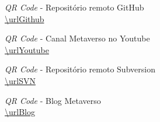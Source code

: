     \begin{figure}[h]
        \centering
        \captionsetup{justification=centering}
        \qrcode{\urlGithub}
        \caption{\textit{QR Code} - Repositório remoto GitHub \\ \url{\urlGithub}}
    \end{figure}
    
    \begin{figure}[h]
        \centering
        \captionsetup{justification=centering}
        \qrcode{\urlYoutube}
        \caption{\textit{QR Code} - Canal Metaverso no Youtube \\ \url{\urlYoutube}}
    \end{figure}
    
    \begin{figure}[h]
        \centering
        \captionsetup{justification=centering}
        \qrcode{\urlSVN}
        \caption{\textit{QR Code} - Repositório remoto Subversion\\
        \url{\urlSVN}}
    \end{figure}
    
    \begin{figure}[h]
        \centering
        \captionsetup{justification=centering}
        \qrcode{\urlBlog}
        \caption{\textit{QR Code} - Blog Metaverso \\ \url{\urlBlog}}
    \end{figure}  




